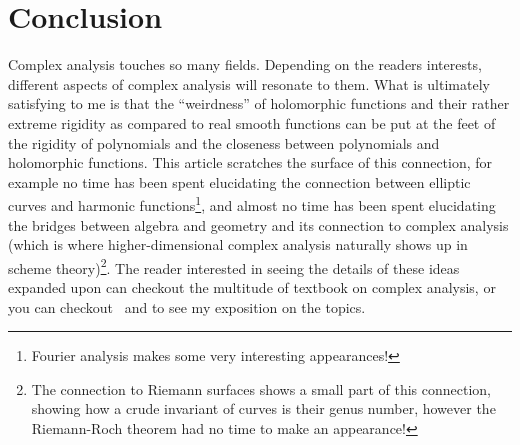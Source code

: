 \documentclass{article}
\begin{document}
\section{Conclusion}

Complex analysis touches so many fields. Depending on the readers interests, different aspects of complex
analysis will resonate to them. What is ultimately satisfying to me is that the ``weirdness'' of holomorphic
functions and their rather extreme rigidity as compared to real smooth functions can be put at the feet of the
rigidity of polynomials and the closeness between polynomials and holomorphic functions. This article
scratches the surface of this connection, for example no time has been spent elucidating the connection
between elliptic curves and harmonic functions\footnote{Fourier analysis makes some very interesting
appearances!}, and almost no time has been spent elucidating the bridges between algebra and geometry and its
connection to complex analysis (which is where higher-dimensional complex analysis naturally shows up in
scheme theory)\footnote{The connection to Riemann surfaces shows a small part of this connection, showing how
  a crude invariant of curves is their genus number, however the Riemann-Roch theorem had no time to make an
appearance!}. The reader interested in seeing the details of these ideas expanded upon can checkout the
multitude of textbook on complex analysis, or you can checkout~\cite{NateComplexAnalysis} and\cite{NateAlgGeo}
to see my exposition on the topics.



\printbibliography
\end{document}
